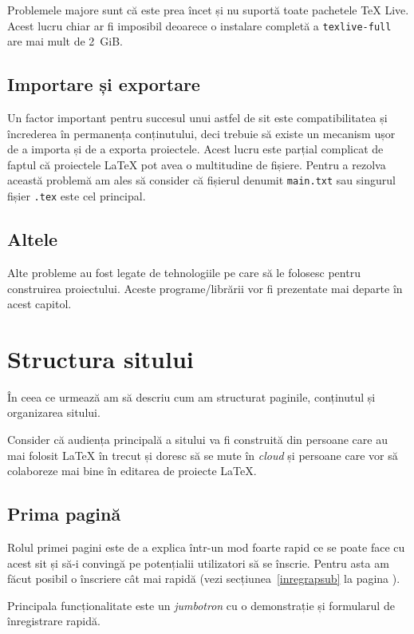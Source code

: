 \documentclass[a4wide,12pt]{report}
\newcommand{\eng}[1]{\emph{#1}} %
\newcommand{\cod}[1]{\texttt{#1}}
\begin{document}
Problemele majore sunt că este prea încet și nu suportă toate pachetele \TeX{}
Live. Acest lucru chiar ar fi imposibil deoarece o instalare completă a
\cod{texlive-full} are mai mult de 2~GiB.

\subsection{Importare și exportare}

Un factor important pentru succesul unui astfel de sit este compatibilitatea și
încrederea în permanența conținutului, deci trebuie să existe un mecanism ușor
de a importa și de a exporta proiectele. Acest lucru este parțial complicat de
faptul că proiectele \LaTeX{} pot avea o multitudine de fișiere. Pentru a
rezolva această problemă am ales să consider că fișierul denumit \cod{main.txt}
sau singurul fișier \cod{.tex} este cel principal.

\subsection{Altele}

Alte probleme au fost legate de tehnologiile pe care să le folosesc pentru
construirea proiectului. Aceste programe/librării vor fi prezentate mai departe
în acest capitol.

\section{Structura sitului}

În ceea ce urmează am să descriu cum am structurat paginile, conținutul și
organizarea sitului.

Consider că audiența principală a sitului va fi construită din persoane care au
mai folosit \LaTeX{} în trecut și doresc să se mute în \eng{cloud} și persoane
care vor să colaboreze mai bine în editarea de proiecte \LaTeX{}.

\subsection{Prima pagină}

Rolul primei pagini este de a explica într-un mod foarte rapid ce se poate face
cu acest sit și să-i convingă pe potențialii utilizatori să se înscrie. Pentru
asta am făcut posibil o înscriere cât mai rapidă (vezi
secțiunea~\ref{inregrapsub} la pagina \pageref{inregrapsub}).

Principala funcționalitate este un \eng{jumbotron} cu o demonstrație și
formularul de înregistrare rapidă.
\end{document}
